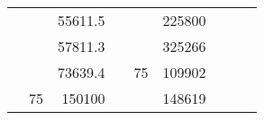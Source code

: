 \begin{table}[H]
\begin{tabular}{|ccrccrccc}
\multicolumn{1}{|c|}{\cellcolor[HTML]{FFFFC7}}                                & \multicolumn{1}{c|}{\cellcolor[HTML]{DAE8FC}}                      & \multicolumn{1}{r|}{\cellcolor[HTML]{DAE8FC}55611.5}   & \multicolumn{1}{c|}{\cellcolor[HTML]{FFFFC7}}                                & \multicolumn{1}{c|}{\cellcolor[HTML]{DAE8FC}}                       & \multicolumn{1}{r|}{\cellcolor[HTML]{DDFDFF}225800}    &                                                                              &                                                                    &                                                        \\ \cline{3-3} \cline{6-6}
\multicolumn{1}{|c|}{\cellcolor[HTML]{FFFFC7}}                                & \multicolumn{1}{c|}{\cellcolor[HTML]{DAE8FC}}                      & \multicolumn{1}{r|}{\cellcolor[HTML]{DDFDFF}57811.3}   & \multicolumn{1}{c|}{\cellcolor[HTML]{FFFFC7}}                                & \multicolumn{1}{c|}{\cellcolor[HTML]{DAE8FC}}                       & \multicolumn{1}{r|}{\cellcolor[HTML]{DAE8FC}325266}    &                                                                              &                                                                    &                                                        \\ \cline{3-3} \cline{6-6}
\multicolumn{1}{|c|}{\cellcolor[HTML]{FFFFC7}}                                & \multicolumn{1}{c|}{\cellcolor[HTML]{DAE8FC}}                      & \multicolumn{1}{r|}{\cellcolor[HTML]{DAE8FC}73639.4}   & \multicolumn{1}{c|}{\cellcolor[HTML]{FFFFC7}}                                & \multicolumn{1}{c|}{\multirow{-10}{*}{\cellcolor[HTML]{DAE8FC}75}}  & \multicolumn{1}{r|}{\cellcolor[HTML]{DDFDFF}109902}    &                                                                              &                                                                    &                                                        \\ \cline{3-3} \cline{5-6}
\multicolumn{1}{|c|}{\cellcolor[HTML]{FFFFC7}}                                & \multicolumn{1}{c|}{\multirow{-10}{*}{\cellcolor[HTML]{DAE8FC}75}} & \multicolumn{1}{r|}{\cellcolor[HTML]{DDFDFF}150100}    & \multicolumn{1}{c|}{\cellcolor[HTML]{FFFFC7}}                                & \multicolumn{1}{c|}{\cellcolor[HTML]{DDFDFF}}                       & \multicolumn{1}{r|}{\cellcolor[HTML]{DAE8FC}148619}    &                                                                              &                                                                    &                                                        \\ \cline{2-3} \cline{6-6}

\end{tabular}
\end{table}
